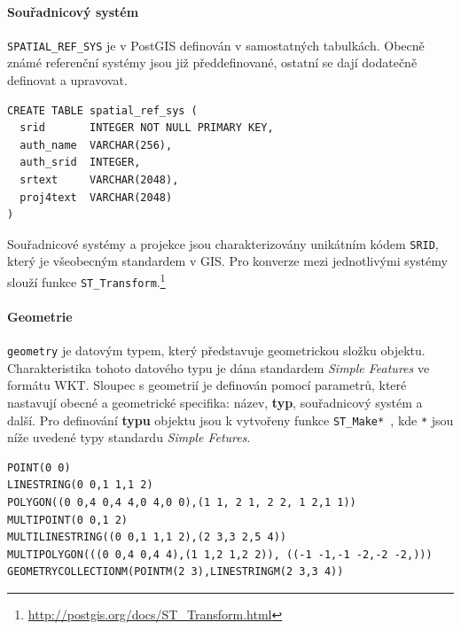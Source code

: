\documentclass[a4paper,12pt,oneside]{report}
\begin{document}
\paragraph*{Souřadnicový systém} \texttt{SPATIAL\_REF\_SYS} je v PostGIS  definován v samostatných tabulkách. Obecně známé referenční systémy jsou již předdefinované, ostatní se dají dodatečně definovat a upravovat.

\begin{verbatim}
CREATE TABLE spatial_ref_sys (
  srid       INTEGER NOT NULL PRIMARY KEY,
  auth_name  VARCHAR(256),
  auth_srid  INTEGER,
  srtext     VARCHAR(2048),
  proj4text  VARCHAR(2048)
)
\end{verbatim}

Souřadnicové systémy a projekce jsou charakterizovány unikátním kódem \texttt{\acs{SRID}}, který je všeobecným standardem v GIS. Pro konverze mezi jednotlivými systémy slouží funkce \texttt{ST\_Transform}.\footnote{\url{http://postgis.org/docs/ST_Transform.html}}


\paragraph*{Geometrie} \texttt{geometry} je datovým typem, který představuje geometrickou složku objektu.  Charakteristika tohoto datového typu je dána standardem \textit{Simple Features} ve formátu \acs{WKT}.
Sloupec s geometrií je definován pomocí parametrů, které nastavují obecné a geometrické  specifika: název, \textbf{typ}, souřadnicový systém a další.
Pro definování \textbf{typu} objektu jsou k vytvořeny funkce \texttt{ST\_Make* }, kde \texttt{*} jsou níže uvedené typy standardu \textit{Simple Fetures}. 


\begin{verbatim}
POINT(0 0)                                               
LINESTRING(0 0,1 1,1 2)                                       
POLYGON((0 0,4 0,4 4,0 4,0 0),(1 1, 2 1, 2 2, 1 2,1 1))          
MULTIPOINT(0 0,1 2)                                              
MULTILINESTRING((0 0,1 1,1 2),(2 3,3 2,5 4))                       
MULTIPOLYGON(((0 0,4 0,4 4),(1 1,2 1,2 2)), ((-1 -1,-1 -2,-2 -2,))) 
GEOMETRYCOLLECTIONM(POINTM(2 3),LINESTRINGM(2 3,3 4))                
\end{verbatim}
\end{document}
